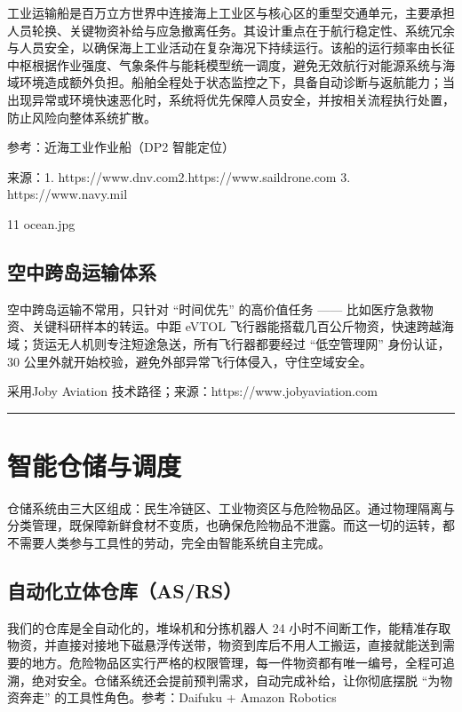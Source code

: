 工业运输船是百万立方世界中连接海上工业区与核心区的重型交通单元，主要承担人员轮换、关键物资补给与应急撤离任务。其设计重点在于航行稳定性、系统冗余与人员安全，以确保海上工业活动在复杂海况下持续运行。该船的运行频率由长征中枢根据作业强度、气象条件与能耗模型统一调度，避免无效航行对能源系统与海域环境造成额外负担。船舶全程处于状态监控之下，具备自动诊断与返航能力；当出现异常或环境快速恶化时，系统将优先保障人员安全，并按相关流程执行处置，防止风险向整体系统扩散。

参考：近海工业作业船（DP2 智能定位）

来源：1.
https://www.dnv.com2.https://www.saildrone.com
 3.
https://www.navy.mil

11 ocean.jpg

\subsection{空中跨岛运输体系}\label{ux7a7aux4e2dux8de8ux5c9bux8fd0ux8f93ux4f53ux7cfb}

空中跨岛运输不常用，只针对 ``时间优先'' 的高价值任务 ------ 比如医疗急救物资、关键科研样本的转运。中距 eVTOL 飞行器能搭载几百公斤物资，快速跨越海域；货运无人机则专注短途急送，所有飞行器都要经过 ``低空管理网'' 身份认证，30 公里外就开始校验，避免外部异常飞行体侵入，守住空域安全。

采用Joby Aviation 技术路径；来源：https://www.jobyaviation.com

\begin{center}\rule{0.5\linewidth}{0.5pt}\end{center}

\section{智能仓储与调度}\label{ux667aux80fdux4ed3ux50a8ux4e0eux8c03ux5ea6}

仓储系统由三大区组成：民生冷链区、工业物资区与危险物品区。通过物理隔离与分类管理，既保障新鲜食材不变质，也确保危险物品不泄露。而这一切的运转，都不需要人类参与工具性的劳动，完全由智能系统自主完成。

\subsection{自动化立体仓库（AS/RS）}\label{ux81eaux52a8ux5316ux7acbux4f53ux4ed3ux5e93asrs}

我们的仓库是全自动化的，堆垛机和分拣机器人 24 小时不间断工作，能精准存取物资，并直接对接地下磁悬浮传送带，物资到库后不用人工搬运，直接就能送到需要的地方。危险物品区实行严格的权限管理，每一件物资都有唯一编号，全程可追溯，绝对安全。仓储系统还会提前预判需求，自动完成补给，让你彻底摆脱 ``为物资奔走'' 的工具性角色。参考：Daifuku + Amazon Robotics

